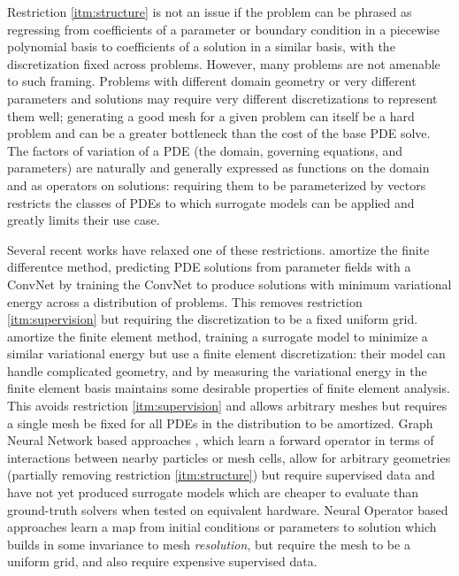Restriction \ref{itm:structure} is not an issue if the problem can be phrased as
regressing from coefficients of a parameter or boundary condition in a piecewise polynomial
basis to coefficients of a solution in a similar basis, with the discretization
fixed across problems.
However, many problems are not amenable to such framing.
Problems with different domain geometry or very different parameters and solutions
may require very different discretizations to represent them well;
generating a good mesh for a given problem can itself be a hard problem and can be a
greater bottleneck than the cost of the base PDE solve.
The factors of variation of a PDE (the domain, governing equations, and parameters)
are naturally and generally expressed as functions on the domain and as
operators on solutions: requiring them to be parameterized by vectors restricts
the classes of PDEs to which surrogate models can be applied and greatly limits their
use case.

Several recent works have relaxed one of these restrictions.
\citet{zhu2019physics} amortize the finite differentce method,
predicting PDE solutions from parameter fields with a
ConvNet by training the ConvNet to produce solutions with minimum variational energy
across a distribution of problems.
This removes restriction \ref{itm:supervision} but requiring the discretization
to be a fixed uniform grid.
\citet{xue2020amortized} amortize the finite element method, training a surrogate model
to minimize a similar variational energy but use a finite element discretization:
their model can handle complicated geometry, and by measuring the variational energy
in the finite element basis maintains some desirable properties of finite element
analysis. This avoids restriction \ref{itm:supervision} and allows arbitrary
meshes but requires a single mesh be fixed for all PDEs in the distribution to be
amortized.
Graph Neural Network based approaches \citep{sanchez2020learning,pfaff2020learning},
which learn a forward operator in terms of
interactions between nearby particles or mesh cells,
allow for arbitrary geometries (partially removing restriction
\ref{itm:structure})
but require supervised data and have not yet produced surrogate models which are
cheaper to evaluate than ground-truth solvers when tested on equivalent hardware.
Neural Operator based approaches \citep{li2020neural,li2020fourier} learn a map from
initial conditions or parameters to solution which builds in
some invariance to mesh \emph{resolution}, but require the mesh to be a uniform
grid, and also require expensive supervised data.
